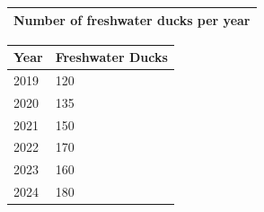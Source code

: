 \documentclass[11pt,a4paper]{article}
\begin{document}
\begin{table}[h]
\begin{tabular}{|l|}
\hline
Number of freshwater ducks per year \\ \hline
\end{tabular}
\end{table}

\begin{table}[h]
\begin{tabular}{|l|l|}
\hline
Year & Freshwater Ducks \\ \hline
2019 & 120 \\ \hline
2020 & 135 \\ \hline
2021 & 150 \\ \hline
2022 & 170 \\ \hline
2023 & 160 \\ \hline
2024 & 180 \\ \hline
\end{tabular}
\end{table}
\end{document}
